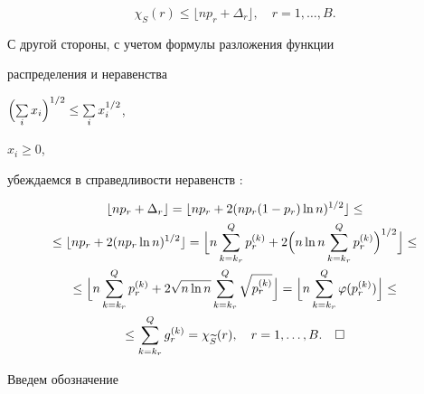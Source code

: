 $$


\chi_{S}(r) \le \lfloor np_{r}+ \Delta_{r} \rfloor,


\quad r=1,\dotsc ,B.


$$





С другой стороны, с учетом формулы  разложения функции


распределения и неравенства


$\Bigl(\sum\limits_{i}x_{i}\Bigr)^{1/2} \le \sum\limits_{i}x_{i}^{1/2}$,


$x_{i} \ge 0$,


убеждаемся в справедливости неравенств :


\begin{gather*}


\lfloor np_{r}+ \Delta_{r} \rfloor =


\lfloor np_{r}+ 2(np_{r}(1-p_{r})\ln n)^{1/2} \rfloor \le \\


%


\le \lfloor np_{r}+ 2(np_{r}\ln n)^{1/2} \rfloor =


\Bigl \lfloor n\sum_{k=k_{r}}^{Q} p_{r}^{(k)}+


 2 \Bigl( n \ln n\sum _{k=k_{r}}^{Q} p_{r}^{(k)}\Bigr)^{1/2}


\Bigr \rfloor \le \\


%


\le  \Bigl \lfloor n\sum_{k=k_{r}}^{Q} p_{r}^{(k)}+


2 \sqrt {n \ln n}\sum _{k=k_{r}}^{Q} \sqrt {p_{r}^{(k)}}


\Bigr \rfloor =


\Bigl \lfloor n\sum _{k=k_{r}}^{Q} \varphi (p_{r}^{(k)})


\Bigr \rfloor \le \\


%


\le


\sum _{k=k_{r}}^{Q} g_{r}^{(k)} = \chi _{\widetilde S}(r),


\quad r=1,\dotsc ,B.\quad\square


\end{gather*}


\medskip





Введем обозначение


$$


